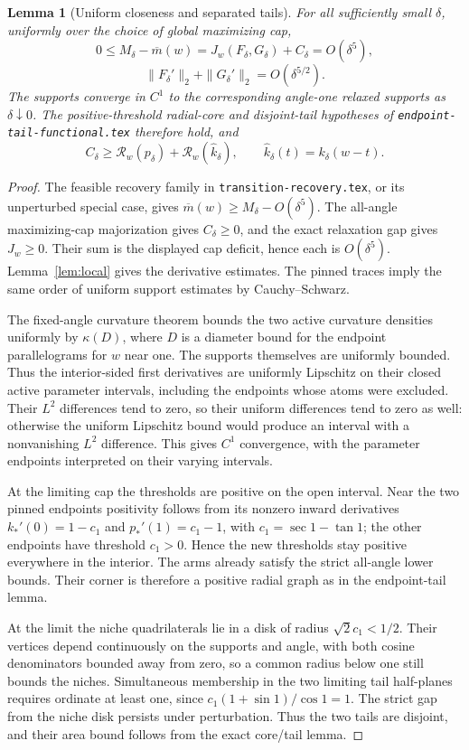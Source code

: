 \documentclass[11pt]{article}
\newtheorem{lemma}[theorem]{Lemma}
\begin{document}
\begin{lemma}[Uniform closeness and separated tails]\label{lem:geometry}
For all sufficiently small $\delta$, uniformly over the choice of global maximizing cap,
\[
 0\le M_\delta-\overline m(w)=J_w(F_\delta,G_\delta)+C_\delta=O(\delta^5),
\]
\[
 \|F_\delta'\|_2+\|G_\delta'\|_2=O(\delta^{5/2}).
\]
The supports converge in $C^1$ to the corresponding angle-one relaxed supports as $\delta\downarrow0$. The positive-threshold radial-core and disjoint-tail hypotheses of \texttt{endpoint-tail-functional.tex} therefore hold, and
\[
 C_\delta\ge\mathcal R_w(p_\delta)+\mathcal R_w(\widehat k_\delta),\qquad
 \widehat k_\delta(t)=k_\delta(w-t).
\]
\end{lemma}
\begin{proof}
The feasible recovery family in \texttt{transition-recovery.tex}, or its unperturbed special case, gives $\overline m(w)\ge M_\delta-O(\delta^5)$. The all-angle maximizing-cap majorization gives $C_\delta\ge0$, and the exact relaxation gap gives $J_w\ge0$. Their sum is the displayed cap deficit, hence each is $O(\delta^5)$. Lemma~\ref{lem:local} gives the derivative estimates. The pinned traces imply the same order of uniform support estimates by Cauchy--Schwarz.

The fixed-angle curvature theorem bounds the two active curvature densities uniformly by $\kappa(D)$, where $D$ is a diameter bound for the endpoint parallelograms for $w$ near one. The supports themselves are uniformly bounded. Thus the interior-sided first derivatives are uniformly Lipschitz on their closed active parameter intervals, including the endpoints whose atoms were excluded. Their $L^2$ differences tend to zero, so their uniform differences tend to zero as well: otherwise the uniform Lipschitz bound would produce an interval with a nonvanishing $L^2$ difference. This gives $C^1$ convergence, with the parameter endpoints interpreted on their varying intervals.

At the limiting cap the thresholds are positive on the open interval. Near the two pinned endpoints positivity follows from its nonzero inward derivatives $k_*'(0)=1-c_1$ and $p_*'(1)=c_1-1$, with $c_1=\sec1-\tan1$; the other endpoints have threshold $c_1>0$. Hence the new thresholds stay positive everywhere in the interior. The arms already satisfy the strict all-angle lower bounds. Their corner is therefore a positive radial graph as in the endpoint-tail lemma.

At the limit the niche quadrilaterals lie in a disk of radius $\sqrt2c_1<1/2$. Their vertices depend continuously on the supports and angle, with both cosine denominators bounded away from zero, so a common radius below one still bounds the niches. Simultaneous membership in the two limiting tail half-planes requires ordinate at least one, since $c_1(1+\sin1)/\cos1=1$. The strict gap from the niche disk persists under perturbation. Thus the two tails are disjoint, and their area bound follows from the exact core/tail lemma.
\end{proof}
\end{document}
